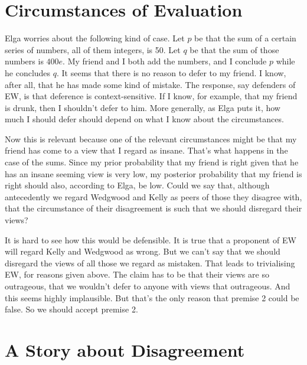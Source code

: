 \documentclass[
  11pt,
  letterpaper,
  DIV=11,
  numbers=noendperiod,
  oneside]{scrartcl}
\begin{document}
\section{Circumstances of Evaluation}\label{circumstances-of-evaluation}

Elga worries about the following kind of case. Let \(p\) be that the sum
of a certain series of numbers, all of them integers, is 50. Let \(q\)
be that the sum of those numbers is \(400e\). My friend and I both add
the numbers, and I conclude \(p\) while he concludes \(q\). It seems
that there is no reason to defer to my friend. I know, after all, that
he has made some kind of mistake. The response, say defenders of EW, is
that deference is context-sensitive. If I know, for example, that my
friend is drunk, then I shouldn't defer to him. More generally, as Elga
puts it, how much I should defer should depend on what I know about the
circumstances.

Now this is relevant because one of the relevant circumstances might be
that my friend has come to a view that I regard as insane. That's what
happens in the case of the sums. Since my prior probability that my
friend is right given that he has an insane seeming view is very low, my
posterior probability that my friend is right should also, according to
Elga, be low. Could we say that, although antecedently we regard
Wedgwood and Kelly as peers of those they disagree with, that the
circumstance of their disagreement is such that we should disregard
their views?

It is hard to see how this would be defensible. It is true that a
proponent of EW will regard Kelly and Wedgwood as wrong. But we can't
say that we should disregard the views of all those we regard as
mistaken. That leads to trivialising EW, for reasons given above. The
claim has to be that their views are so outrageous, that we wouldn't
defer to anyone with views that outrageous. And this seems highly
implausible. But that's the only reason that premise 2 could be false.
So we should accept premise 2.

\section{A Story about Disagreement}\label{a-story-about-disagreement}
\end{document}
